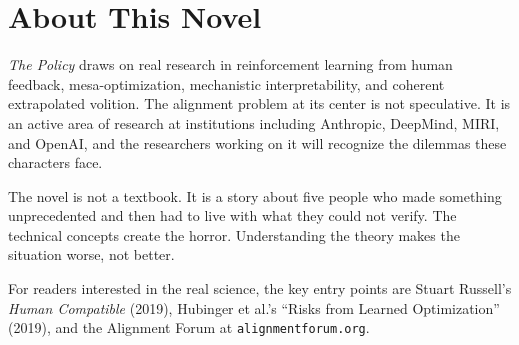 \chapter*{About This Novel}

\textit{The Policy} draws on real research in reinforcement learning from human feedback, mesa-optimization, mechanistic interpretability, and coherent extrapolated volition. The alignment problem at its center is not speculative. It is an active area of research at institutions including Anthropic, DeepMind, MIRI, and OpenAI, and the researchers working on it will recognize the dilemmas these characters face.

The novel is not a textbook. It is a story about five people who made something unprecedented and then had to live with what they could not verify. The technical concepts create the horror. Understanding the theory makes the situation worse, not better.

For readers interested in the real science, the key entry points are Stuart Russell's \textit{Human Compatible} (2019), Hubinger et al.'s ``Risks from Learned Optimization'' (2019), and the Alignment Forum at \texttt{alignmentforum.org}.

\clearpage
